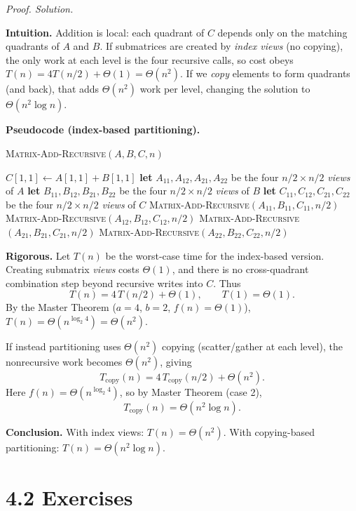 \documentclass[12pt]{article}
\theoremstyle{definition}
\begin{document}
\medskip
\noindent\textit{Proof. Solution.}

\noindent\textbf{Intuition.}
Addition is local: each quadrant of $C$ depends only on the matching quadrants of $A$ and $B$.
If submatrices are created by \emph{index views} (no copying), the only work at each level is
the four recursive calls, so cost obeys $T(n)=4T(n/2)+\Theta(1)=\Theta(n^2)$.
If we \emph{copy} elements to form quadrants (and back), that adds $\Theta(n^2)$ work per level,
changing the solution to $\Theta(n^2\log n)$.

\noindent\textbf{Pseudocode (index-based partitioning).}
\begin{algorithm}[H]
\caption{\textsc{Matrix-Add-Recursive}$(A,B,C,n)$}
\begin{algorithmic}[1]
  \State $C[1,1] \gets A[1,1] + B[1,1]$ \State \Return
\EndIf
\State \textbf{let} $A_{11},A_{12},A_{21},A_{22}$ be the four $n/2\times n/2$ \emph{views} of $A$
\State \textbf{let} $B_{11},B_{12},B_{21},B_{22}$ be the four $n/2\times n/2$ \emph{views} of $B$
\State \textbf{let} $C_{11},C_{12},C_{21},C_{22}$ be the four $n/2\times n/2$ \emph{views} of $C$
\State \textsc{Matrix-Add-Recursive}$(A_{11},B_{11},C_{11},n/2)$
\State \textsc{Matrix-Add-Recursive}$(A_{12},B_{12},C_{12},n/2)$
\State \textsc{Matrix-Add-Recursive}$(A_{21},B_{21},C_{21},n/2)$
\State \textsc{Matrix-Add-Recursive}$(A_{22},B_{22},C_{22},n/2)$
\end{algorithmic}
\end{algorithm}

\noindent\textbf{Rigorous.}
Let $T(n)$ be the worst-case time for the index-based version. Creating submatrix \emph{views}
costs $\Theta(1)$, and there is no cross-quadrant combination step beyond recursive writes into $C$.
Thus
\[
T(n)=4\,T(n/2)+\Theta(1),\qquad T(1)=\Theta(1).
\]
By the Master Theorem ($a=4$, $b=2$, $f(n)=\Theta(1)$), $T(n)=\Theta(n^{\log_2 4})=\Theta(n^2)$.

If instead partitioning uses $\Theta(n^2)$ copying (scatter/gather at each level), the nonrecursive
work becomes $\Theta(n^2)$, giving
\[
T_{\text{copy}}(n)=4\,T_{\text{copy}}(n/2)+\Theta(n^2).
\]
Here $f(n)=\Theta(n^{\log_2 4})$, so by Master Theorem (case 2),
\[
T_{\text{copy}}(n)=\Theta(n^2\log n).
\]

\noindent\textbf{Conclusion.}
With index views: $\boxed{T(n)=\Theta(n^2)}$.
With copying-based partitioning: $\boxed{T(n)=\Theta(n^2\log n)}$.

\newpage

\dotfill
\section*{4.2 Exercises}
\dotfill
\end{document}
